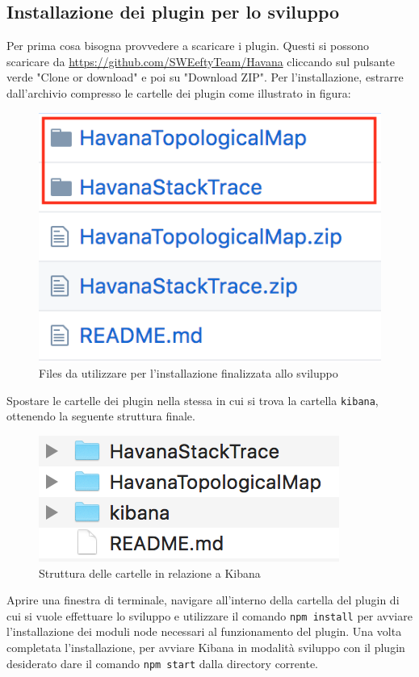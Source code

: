 \subsection{Installazione dei plugin per lo sviluppo}
Per prima cosa bisogna provvedere a scaricare i plugin. Questi si possono scaricare da \href{https://github.com/SWEeftyTeam/Havana}{https://github.com/SWEeftyTeam/Havana} cliccando sul pulsante verde "Clone or download" e poi su "Download ZIP".
Per l'installazione, estrarre dall'archivio compresso le cartelle dei plugin come illustrato in figura:
\begin{figure}[H]
	\centering 
	\includegraphics{Images/strutturadev}
	\caption{Files da utilizzare per l'installazione finalizzata allo sviluppo}
\end{figure}
Spostare le cartelle dei plugin nella stessa  in cui si trova la cartella \texttt{kibana}, ottenendo la seguente struttura finale.\\
\begin{figure}[H]
	\centering 
	\includegraphics{Images/pos}
	\caption{Struttura delle cartelle in relazione a Kibana}
\end{figure}
Aprire una finestra di terminale, navigare all'interno della cartella del plugin di cui si vuole effettuare lo sviluppo e utilizzare il comando \texttt{npm install} per avviare l'installazione dei moduli node necessari al funzionamento del plugin.
Una volta completata l'installazione, per avviare Kibana in modalità sviluppo con il plugin desiderato dare il comando \texttt{npm start} dalla directory corrente.

